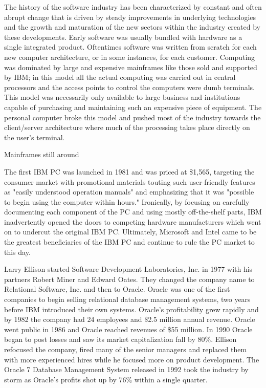 The history of the software industry has been characterized by constant and often abrupt change that is driven by steady improvements in underlying technologies and the growth and maturation of the new sectors within the industry created by these developments. Early software was usually bundled with hardware as a single integrated product.\autocite[4]{buxmann2012software}
Oftentimes software was written from scratch for each new computer architecture, or in some instances, for each customer.\autocite{MainframesStillAround}
Computing was dominated by large and expensive mainframes like those sold and supported by IBM; in this model all the actual computing was carried out in central processors and the access points to control the computers were dumb terminals.\autocite[]{LargeParadigmShiftCloudComputing}
This model was necessarily only available to large business and institutions capable of purchasing and maintaining such an expensive piece of equipment.
The personal computer broke this model and pushed most of the industry towards the client/server architecture where much of the processing takes place directly on the user's terminal.\autocite[]{LargeParadigmShiftCloudComputing}

Mainframes still around\autocite{MainframesStillAround}

The first IBM PC was launched in 1981 and was priced at \$1,565, targeting the consumer market with promotional materials touting such user-friendly features as "easily understood operation manuals" and emphasizing that it was "possible to begin using the computer within hours."\autocite{PCBirthday}
Ironically, by focusing on carefully documenting each component of the PC and using mostly off-the-shelf parts, IBM inadvertently opened the doors to competing hardware manufacturers which went on to undercut the original IBM PC.\autocite{PCBirthday}
Ultimately, Microsoft and Intel came to be the greatest beneficiaries of the IBM PC and continue to rule the PC market to this day.\autocite{PCBirthday}

Larry Ellison started Software Development Laboratories, Inc. in 1977 with his partners Robert Miner and Edward Oates.\autocite[113]{finkle2012larry}
They changed the company name to Relational Software, Inc. and then to Oracle.\autocite[113]{finkle2012larry}
Oracle was one of the first companies to begin selling relational database management systems, two years before IBM introduced their own systems.\autocite[113]{finkle2012larry}
Oracle's profitability grew rapidly and by 1982 the company had 24 employees and \$2.5 million annual revenue.\autocite[113]{finkle2012larry}
Oracle went public in 1986 and Oracle reached revenues of \$55 million.\autocite[113]{finkle2012larry}
In 1990 Oracle began to post losses and saw its market capitalization fall by 80\%.\autocite[113]{finkle2012larry}
Ellison refocused the company, fired many of the senior managers and replaced them with more experienced hires while he focused more on product development.\autocite[113]{finkle2012larry}
The Oracle 7 Database Management System released in 1992 took the industry by storm as Oracle's profits shot up by 76\% within a single quarter.\autocite[114]{finkle2012larry}


